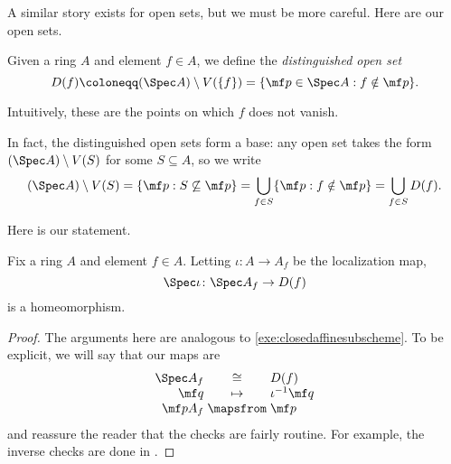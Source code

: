 \documentclass[../notes.tex]{subfiles}
\begin{document}
A similar story exists for open sets, but we must be more careful. Here are our open sets.
\begin{definition}
	Given a ring $A$ and element $f\in A$, we define the \textit{distinguished open set}
	\[D(f)\coloneqq(\Spec A)\setminus V(\{f\})=\{\mf p\in\Spec A:f\notin\mf p\}.\]
\end{definition}
Intuitively, these are the points on which $f$ does not vanish.
\begin{remark}
	In fact, the distinguished open sets form a base: any open set takes the form $(\Spec A)\setminus V(S)$ for some $S\subseteq A$, so we write
	\[(\Spec A)\setminus V(S)=\{\mf p:S\not\subseteq\mf p\}=\bigcup_{f\in S}\{\mf p:f\notin\mf p\}=\bigcup_{f\in S}D(f).\]
\end{remark}
Here is our statement.
\begin{exe}
	Fix a ring $A$ and element $f\in A$. Letting $\iota\colon A\to A_f$ be the localization map,
	\[\Spec\iota\colon\Spec A_f\to D(f)\]
	is a homeomorphism.
\end{exe}
\begin{proof}
	The arguments here are analogous to \autoref{exe:closedaffinesubscheme}. To be explicit, we will say that our maps are
	\[\arraycolsep=1.4pt\begin{array}{rcl}
		\Spec A_f &\cong& D(f) \\
		\mf q &\mapsto& \iota^{-1}\mf q \\
		\mf pA_f &\mapsfrom& \mf p
	\end{array}\]
	and reassure the reader that the checks are fairly routine. For example, the inverse checks are done in \cite[Proposition~2.2]{eisenbud-comm-alg}.
\end{proof}
\end{document}
